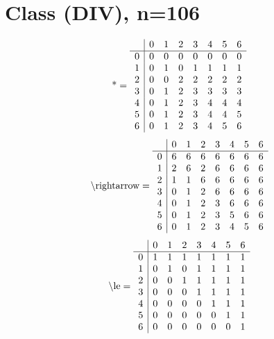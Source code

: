 \documentclass[11pt]{article}
\begin{document}
\section{Class (DIV), n=106}
\[\text{*} = 
\begin{array}{r | r r r r r r r}
 & 0 & 1 & 2 & 3 & 4 & 5 & 6 \\ \hline
0 & 0 & 0 & 0 & 0 & 0 & 0 & 0 \\
1 & 0 & 1 & 0 & 1 & 1 & 1 & 1 \\
2 & 0 & 0 & 2 & 2 & 2 & 2 & 2 \\
3 & 0 & 1 & 2 & 3 & 3 & 3 & 3 \\
4 & 0 & 1 & 2 & 3 & 4 & 4 & 4 \\
5 & 0 & 1 & 2 & 3 & 4 & 4 & 5 \\
6 & 0 & 1 & 2 & 3 & 4 & 5 & 6 \\
\end{array}
\]
\[\text{\textbackslash rightarrow} = 
\begin{array}{r | r r r r r r r}
 & 0 & 1 & 2 & 3 & 4 & 5 & 6 \\ \hline
0 & 6 & 6 & 6 & 6 & 6 & 6 & 6 \\
1 & 2 & 6 & 2 & 6 & 6 & 6 & 6 \\
2 & 1 & 1 & 6 & 6 & 6 & 6 & 6 \\
3 & 0 & 1 & 2 & 6 & 6 & 6 & 6 \\
4 & 0 & 1 & 2 & 3 & 6 & 6 & 6 \\
5 & 0 & 1 & 2 & 3 & 5 & 6 & 6 \\
6 & 0 & 1 & 2 & 3 & 4 & 5 & 6 \\
\end{array}
\]
\[\text{\textbackslash le} = 
\begin{array}{r | r r r r r r r}
 & 0 & 1 & 2 & 3 & 4 & 5 & 6 \\ \hline
0 & 1 & 1 & 1 & 1 & 1 & 1 & 1 \\
1 & 0 & 1 & 0 & 1 & 1 & 1 & 1 \\
2 & 0 & 0 & 1 & 1 & 1 & 1 & 1 \\
3 & 0 & 0 & 0 & 1 & 1 & 1 & 1 \\
4 & 0 & 0 & 0 & 0 & 1 & 1 & 1 \\
5 & 0 & 0 & 0 & 0 & 0 & 1 & 1 \\
6 & 0 & 0 & 0 & 0 & 0 & 0 & 1 \\
\end{array}
\]
\end{document}
